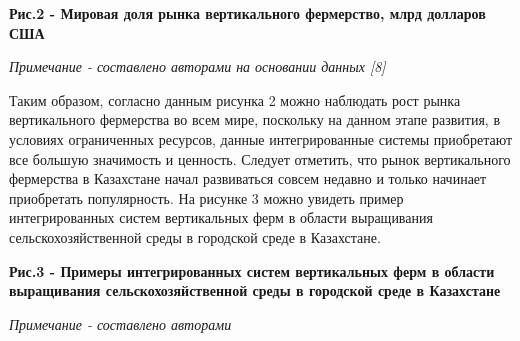 {\bfseries Рис.2 - Мировая доля рынка вертикального фермерство, млрд долларов США}

\emph{Примечание - составлено авторами на основании данных {[}8{]}}

\begin{multicols}{2}
Таким образом, согласно данным рисунка 2 можно наблюдать рост рынка
вертикального фермерства во всем мире, поскольку на данном этапе
развития, в условиях ограниченных ресурсов, данные интегрированные
системы приобретают все большую значимость и ценность. Следует отметить,
что рынок вертикального фермерства в Казахстане начал развиваться совсем
недавно и только начинает приобретать популярность. На рисунке 3 можно
увидеть пример интегрированных систем вертикальных ферм в области
выращивания сельскохозяйственной среды в городской среде в Казахстане.
\end{multicols}

{\bfseries Рис.3 - Примеры интегрированных систем вертикальных ферм в области выращивания сельскохозяйственной среды в городской среде в Казахстане}

\emph{Примечание - составлено авторами}

